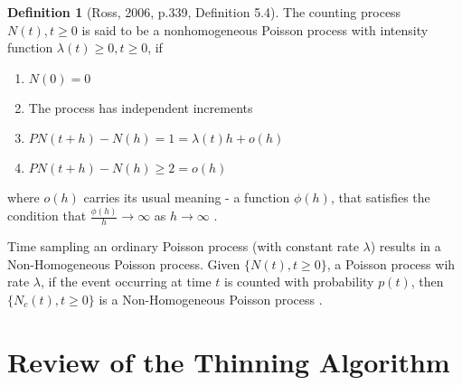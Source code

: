 \documentclass[%
 reprint,
 amsmath,amssymb,
 aps,
]{revtex4-2}
\theoremstyle{definition}
\newtheorem{definition}{Definition}[section]
\begin{document}
\begin{definition}[Ross, 2006, p.339, Definition 5.4] \cite{Ross_2006} The counting process ${N(t), t \ge 0}$ is said to be a nonhomogeneous Poisson process with intensity function $\lambda(t) \ge 0, t \ge 0$, if
\begin{enumerate}
\item $N(0) = 0$
\item The process has independent increments
\item $P{N(t + h) - N(h) = 1} = \lambda(t)h + o(h)$
\item $P{N(t + h) - N(h) \ge 2} = o(h)$
\end{enumerate}
where $o(h)$ carries its usual meaning - a function $\phi(h)$, that satisfies the condition that $\frac{\phi(h)}{h}\to\infty$ as $h\to\infty$ \cite{billingsley_1995}.
\end{definition}

Time sampling an ordinary Poisson process (with constant rate $\lambda$) results in a Non-Homogeneous Poisson process. Given $\{N(t), t \ge 0\}$, a Poisson process wih rate $\lambda$, if the event occurring at time $t$ is counted with probability $p(t)$, then $\{N_c(t) , t\ge 0\}$ is a Non-Homogeneous Poisson process \cite{Ross_2006}.

\section{\label{q:2}Review of the Thinning Algorithm}
\end{document}
